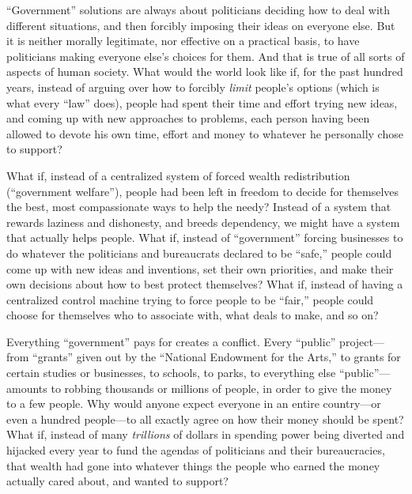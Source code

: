 \documentclass{book}
\begin{document}
\enquote{Government} solutions are always about politicians deciding how to deal with different situations, and then forcibly imposing their ideas on everyone else. But it is neither morally legitimate, nor effective on a practical basis, to have politicians making everyone else's choices for them. And that is true of all sorts of aspects of human society. What would the world look like if, for the past hundred years, instead of arguing over how to forcibly \emph{limit} people's options (which is what every \enquote{law} does), people had spent their time and effort trying new ideas, and coming up with new approaches to problems, each person having been allowed to devote his own time, effort and money to whatever he personally chose to support?

What if, instead of a centralized system of forced wealth redistribution (\enquote{government welfare}), people had been left in freedom to decide for themselves the best, most compassionate ways to help the needy? Instead of a system that rewards laziness and dishonesty, and breeds dependency, we might have a system that actually helps people. What if, instead of \enquote{government} forcing businesses to do whatever the politicians and bureaucrats declared to be \enquote{safe,} people could come up with new ideas and inventions, set their own priorities, and make their own decisions about how to best protect themselves? What if, instead of having a centralized control machine trying to force people to be \enquote{fair,} people could choose for themselves who to associate with, what deals to make, and so on?

Everything \enquote{government} pays for creates a conflict. Every \enquote{public} project---from \enquote{grants} given out by the \enquote{National Endowment for the Arts,} to grants for certain studies or businesses, to schools, to parks, to everything else \enquote{public}---amounts to robbing thousands or millions of people, in order to give the money to a few people. Why would anyone expect everyone in an entire country---or even a hundred people---to all exactly agree on how their money should be spent? What if, instead of many \emph{trillions} of dollars in spending power being diverted and hijacked every year to fund the agendas of politicians and their bureaucracies, that wealth had gone into whatever things the people who earned the money actually cared about, and wanted to support?
\end{document}
